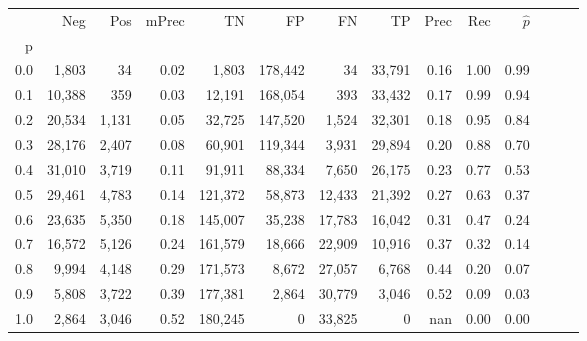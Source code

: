 \begin{tabular}{rrrrrrrrrrrrrr}
\toprule
{} &     Neg &    Pos & mPrec &       TN &       FP &      FN &      TP &  Prec &   Rec & $\hat{p}$ \\
p   &         &        &       &          &          &         &         &       &       &           \\
\midrule
0.0 &   1,803 &     34 &  0.02 &    1,803 &  178,442 &      34 &  33,791 &  0.16 &  1.00 &      0.99 \\
0.1 &  10,388 &    359 &  0.03 &   12,191 &  168,054 &     393 &  33,432 &  0.17 &  0.99 &      0.94 \\
0.2 &  20,534 &  1,131 &  0.05 &   32,725 &  147,520 &   1,524 &  32,301 &  0.18 &  0.95 &      0.84 \\
0.3 &  28,176 &  2,407 &  0.08 &   60,901 &  119,344 &   3,931 &  29,894 &  0.20 &  0.88 &      0.70 \\
0.4 &  31,010 &  3,719 &  0.11 &   91,911 &   88,334 &   7,650 &  26,175 &  0.23 &  0.77 &      0.53 \\
0.5 &  29,461 &  4,783 &  0.14 &  121,372 &   58,873 &  12,433 &  21,392 &  0.27 &  0.63 &      0.37 \\
0.6 &  23,635 &  5,350 &  0.18 &  145,007 &   35,238 &  17,783 &  16,042 &  0.31 &  0.47 &      0.24 \\
0.7 &  16,572 &  5,126 &  0.24 &  161,579 &   18,666 &  22,909 &  10,916 &  0.37 &  0.32 &      0.14 \\
0.8 &   9,994 &  4,148 &  0.29 &  171,573 &    8,672 &  27,057 &   6,768 &  0.44 &  0.20 &      0.07 \\
0.9 &   5,808 &  3,722 &  0.39 &  177,381 &    2,864 &  30,779 &   3,046 &  0.52 &  0.09 &      0.03 \\
1.0 &   2,864 &  3,046 &  0.52 &  180,245 &        0 &  33,825 &       0 &   nan &  0.00 &      0.00 \\
\bottomrule
\end{tabular}
